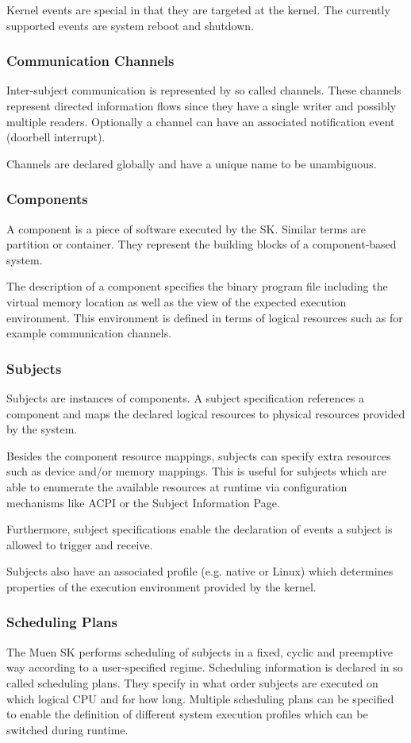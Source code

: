 \documentclass[a4paper,twoside,titlepage]{article}
\begin{document}
Kernel events are special in that they are targeted at the kernel. The
currently supported events are system reboot and shutdown.

\subsubsection{Communication Channels}
Inter-subject communication is represented by so called channels. These channels
represent directed information flows since they have a single writer and
possibly multiple readers. Optionally a channel can have an associated
notification event (doorbell interrupt).

Channels are declared globally and have a unique name to be unambiguous.

\subsubsection{Components}
A component is a piece of software executed by the SK. Similar terms are
partition or container. They represent the building blocks of a component-based
system.

The description of a component specifies the binary program file including the
virtual memory location as well as the view of the expected execution
environment. This environment is defined in terms of logical resources such as
for example communication channels.

\subsubsection{Subjects}
Subjects are instances of components. A subject specification references a
component and maps the declared logical resources to physical resources provided
by the system.

Besides the component resource mappings, subjects can specify extra resources
such as device and/or memory mappings. This is useful for subjects which are
able to enumerate the available resources at runtime via configuration
mechanisms like ACPI or the Subject Information Page.

Furthermore, subject specifications enable the declaration of events a subject
is allowed to trigger and receive.

Subjects also have an associated profile (e.g. native or Linux) which determines
properties of the execution environment provided by the kernel.

\subsubsection{Scheduling Plans}
The Muen SK performs scheduling of subjects in a fixed, cyclic and
preemptive way according to a user-specified regime. Scheduling information is
declared in so called scheduling plans. They specify in what order subjects are
executed on which logical CPU and for how long. Multiple scheduling plans can be
specified to enable the definition of different system execution profiles which
can be switched during runtime.
\end{document}
